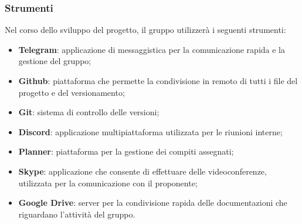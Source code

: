 \subsubsection{Strumenti}
Nel corso dello sviluppo del progetto, il gruppo utilizzerà i seguenti strumenti: 
\begin{itemize}
\item \textbf{Telegram\glo}: applicazione di messaggistica per la comunicazione rapida e la gestione del gruppo; 
\item \textbf{Github\glo}: piattaforma che permette la condivisione in remoto di tutti i file del progetto e del versionamento;
\item \textbf{Git\glo}: sistema di controllo delle versioni;
\item \textbf{Discord}: applicazione multipiattaforma utilizzata per le riunioni interne;
\item \textbf{Planner}: piattaforma per la gestione dei compiti assegnati;
\item \textbf{Skype}: applicazione che consente di effettuare delle videoconferenze, utilizzata per la comunicazione con il proponente;
\item \textbf{Google Drive}: server per la condivisione rapida delle documentazioni che riguardano l'attività del gruppo.
\end{itemize}